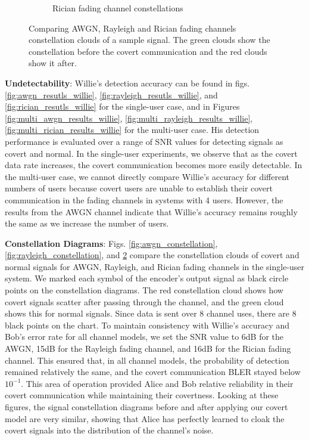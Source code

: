 \begin{figure}[tp!]
\begin{subfigure}{0.325\linewidth}
\begin{subfigure}{0.48\textwidth}
		\end{subfigure}
		\caption{Rician fading channel constellations}
		\label{fig:rician_constellation}
	\end{subfigure}
	\caption{Comparing AWGN, Rayleigh and Rician fading channels constellation clouds of a sample signal. The green clouds show the constellation before the covert communication and the red clouds show it after.}
\end{figure}

\textbf{Undetectability}: Willie's detection accuracy can be found in figs. \ref{fig:awgn_resutls_willie}, \ref{fig:rayleigh_resutls_willie}, and \ref{fig:rician_resutls_willie} for the single-user case, and in Figures \ref{fig:multi_awgn_results_willie}, \ref{fig:multi_rayleigh_results_willie}, \ref{fig:multi_rician_results_willie} for the multi-user case. His detection performance is evaluated over a range of SNR values for detecting signals as covert and normal. In the single-user experiments, we observe that as the covert data rate increases, the covert communication becomes more easily detectable. In the multi-user case, we cannot directly compare Willie's accuracy for different numbers of users because covert users are unable to establish their covert communication in the fading channels in systems with 4 users. However, the results from the AWGN channel indicate that Willie's accuracy remains roughly the same as we increase the number of users.

\textbf{Constellation Diagrams}: Figs. \ref{fig:awgn_constellation}, \ref{fig:rayleigh_constellation}, and \ref{fig:rician_constellation} compare the constellation clouds of covert and normal signals for AWGN, Rayleigh, and Rician fading channels in the single-user system. We marked each symbol of the encoder's output signal as black circle points on the constellation diagrams. The red constellation cloud shows how covert signals scatter after passing through the channel, and the green cloud shows this for normal signals. Since data is sent over 8 channel uses, there are 8 black points on the chart. To maintain consistency with Willie's accuracy and Bob's error rate for all channel models, we set the SNR value to 6dB for the AWGN, 15dB for the Rayleigh fading channel, and 16dB for the Rician fading channel. This ensured that, in all channel models, the probability of detection remained relatively the same, and the covert communication BLER stayed below \(10^{-1}\). This area of operation provided Alice and Bob relative reliability in their covert communication while maintaining their covertness.
Looking at these figures, the signal constellation diagrams before and after applying our covert model are very similar, showing that Alice has perfectly learned to cloak the covert signals into the distribution of the channel's noise.